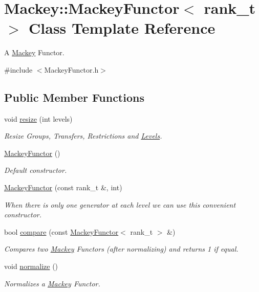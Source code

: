 \hypertarget{classMackey_1_1MackeyFunctor}{}\section{Mackey\+:\+:Mackey\+Functor$<$ rank\+\_\+t $>$ Class Template Reference}
\label{classMackey_1_1MackeyFunctor}


A \hyperlink{namespaceMackey}{Mackey} Functor.  




{\ttfamily \#include $<$Mackey\+Functor.\+h$>$}

\subsection*{Public Member Functions}
\begin{DoxyCompactItemize}
\item 
void \hyperlink{classMackey_1_1MackeyFunctor_a44d3104a47f23de5d8141b7800db6d11}{resize} (int levels)
\begin{DoxyCompactList}\small\item\em Resize Groups, Transfers, Restrictions and \hyperlink{classMackey_1_1Levels}{Levels}. \end{DoxyCompactList}\item 
\hyperlink{classMackey_1_1MackeyFunctor_a075cd364217700d5f5c2459d4a988a93}{Mackey\+Functor} ()
\begin{DoxyCompactList}\small\item\em Default constructor. \end{DoxyCompactList}\item 
\hyperlink{classMackey_1_1MackeyFunctor_a7cdc1be794a7b39e7d4b86c2ad26355e}{Mackey\+Functor} (const rank\+\_\+t \&, int)
\begin{DoxyCompactList}\small\item\em When there is only one generator at each level we can use this convenient constructor. \end{DoxyCompactList}\item 
bool \hyperlink{classMackey_1_1MackeyFunctor_a334a91a445ac86cc5cce53b29efd6df1}{compare} (const \hyperlink{classMackey_1_1MackeyFunctor}{Mackey\+Functor}$<$ rank\+\_\+t $>$ \&)
\begin{DoxyCompactList}\small\item\em Compares two \hyperlink{namespaceMackey}{Mackey} Functors (after normalizing) and returns 1 if equal. \end{DoxyCompactList}\item 
void \hyperlink{classMackey_1_1MackeyFunctor_ae63fdf151f6ee653d6cb50d442948e30}{normalize} ()
\begin{DoxyCompactList}\small\item\em Normalizes a \hyperlink{namespaceMackey}{Mackey} Functor. \end{DoxyCompactList}\end{DoxyCompactItemize}
